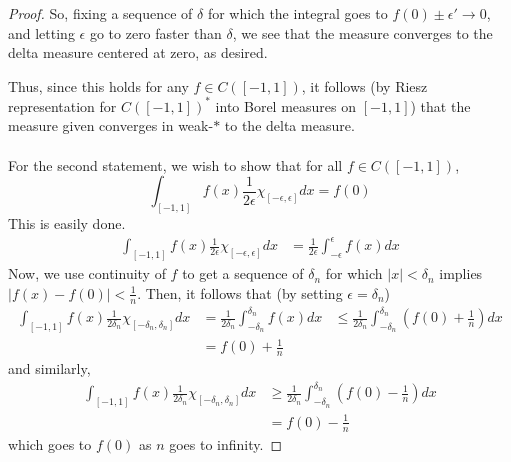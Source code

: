 \documentclass[fontsize=11pt]{scrartcl} %
\numberwithin{equation}{section} %
\numberwithin{figure}{section} %
\numberwithin{table}{section} %
\begin{document}
\begin{proof}
    So, fixing a sequence of $\delta$ for which the integral goes to
    $f(0)\pm\epsilon'\to 0$, and letting $\epsilon$ go to zero faster than
    $\delta$, we see that the measure converges to the delta measure centered at
    zero, as desired.
    
    Thus, since this holds for any $f\in C([-1,1])$, it follows (by Riesz
    representation for $C([-1,1])^*$ into Borel measures on $[-1,1]$) that the
    measure given converges in weak-$*$ to the delta measure.
    \\
    \\
    For the second statement, we wish to show that for all $f\in C([-1,1])$,
    \[
        \int_{[-1,1]}f(x)\frac{1}{2\epsilon}\chi_{[-\epsilon,\epsilon]}dx = f(0)
    \]
    This is easily done.
    \[
        \begin{aligned}
        \int_{[-1,1]}f(x)\frac{1}{2\epsilon}\chi_{[-\epsilon,\epsilon]}dx
            &= \frac{1}{2\epsilon}\int_{-\epsilon}^{\epsilon}f(x)dx
        \end{aligned}
    \]
    Now, we use continuity of $f$ to get a sequence of $\delta_n$ for which
    $|x|<\delta_n$ implies $|f(x)-f(0)|<\frac{1}{n}$. Then, it follows that (by
    setting $\epsilon = \delta_n$)
    \[
        \begin{aligned}
        \int_{[-1,1]}f(x)\frac{1}{2\delta_n}\chi_{[-\delta_n,\delta_n]}dx
            &= \frac{1}{2\delta_n}\int_{-\delta_n}^{\delta_n}f(x)dx
            &\leq
            \frac{1}{2\delta_n}\int_{-\delta_n}^{\delta_n}(f(0)+\frac{1}{n})dx\\
            &=f(0)+\frac{1}{n}
        \end{aligned}
    \]
    and similarly,
    \[
        \begin{aligned}
        \int_{[-1,1]}f(x)\frac{1}{2\delta_n}\chi_{[-\delta_n,\delta_n]}dx
            &\geq
            \frac{1}{2\delta_n}\int_{-\delta_n}^{\delta_n}(f(0)-\frac{1}{n})dx\\
            &=f(0)-\frac{1}{n}
        \end{aligned}
    \]
    which goes to $f(0)$ as $n$ goes to infinity.
\end{proof}

\newpage
\end{document}
